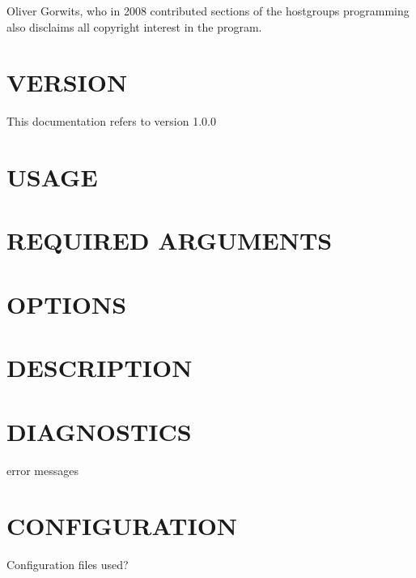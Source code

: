 \documentclass{book}
\begin{document}
Oliver Gorwits, who in 2008 contributed sections of the hostgroups programming also disclaims all copyright interest in the program.




\section{VERSION}
\label{_VERSION}
\hypertarget{_VERSION}{}



This documentation refers to version 1.0.0


\section{USAGE}
\label{_USAGE}
\hypertarget{_USAGE}{}


\section{REQUIRED ARGUMENTS}
\label{_REQUIRED_ARGUMENTS}
\hypertarget{_REQUIRED_ARGUMENTS}{}


\section{OPTIONS}
\label{_OPTIONS}
\hypertarget{_OPTIONS}{}


\section{DESCRIPTION}
\label{_DESCRIPTION}
\hypertarget{_DESCRIPTION}{}


\section{DIAGNOSTICS}
\label{_DIAGNOSTICS}
\hypertarget{_DIAGNOSTICS}{}



error messages


\section{CONFIGURATION}
\label{_CONFIGURATION}
\hypertarget{_CONFIGURATION}{}



Configuration files used?
\end{document}
